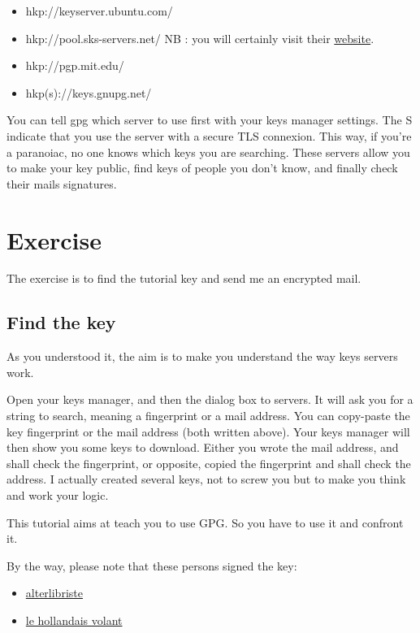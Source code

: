 \begin{itemize}
\itemsep1pt\parskip0pt
\item
  hkp://keyserver.ubuntu.com/
\item
  hkp://pool.sks-servers.net/ NB : you will certainly visit their
  \href{https://sks-keyservers.net/i/}{website}.
\item
  hkp://pgp.mit.edu/
\item
  hkp(s)://keys.gnupg.net/
\end{itemize}

You can tell gpg which server to use first with your keys manager settings. The S indicate that you use the server with a secure TLS connexion. This way, if you're a paranoiac, no one knows which keys you are searching. These servers allow you to make your key public, find keys of people you don't know, and finally check their mails signatures.

\section{Exercise}\label{exercise}

The exercise is to find the tutorial key and send me an encrypted mail.

\subsection{Find the key}\label{find-the-key}

As you understood it, the aim is to make you understand the way keys servers work.

Open your keys manager, and then the dialog box to servers. It will ask you for a string to search, meaning a fingerprint or a mail address.
You can copy-paste the key fingerprint or the mail address (both written above). Your keys manager will then show you some keys to download.
Either you wrote the mail address, and shall check the fingerprint, or opposite, copied the fingerprint and shall check the address. I actually
created several keys, not to screw you but to make you think and work your logic.

This tutorial aims at teach you to use GPG. So you have to use it and confront it.

By the way, please note that these persons signed the key:

\begin{itemize}
\itemsep1pt\parskip0pt
\item
  \href{http://alterlibriste.free.fr/}{alterlibriste}
\item
  \href{http://lehollandaisvolant.net/}{le hollandais volant}
\end{itemize}

